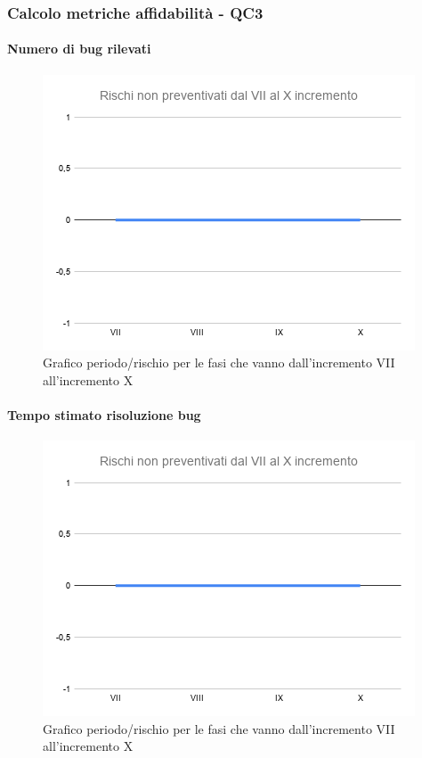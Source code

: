 \subsubsection{Calcolo metriche affidabilità - QC3}
\paragraph{Numero di bug rilevati}
\begin{figure}[H]
			\centering%
			\includegraphics[width=0.8\linewidth]{./res/images/RischiNonPreven_4.png}
			\caption{Grafico periodo/rischio per le fasi che vanno dall'incremento VII all'incremento X}
			\label{fig:Grafico periodo/rischio per le fasi che vanno dall'incremento VII all'incremento X}
	\end{figure}
\paragraph{Tempo stimato risoluzione bug}
\begin{figure}[H]
			\centering%
			\includegraphics[width=0.8\linewidth]{./res/images/RischiNonPreven_4.png}
			\caption{Grafico periodo/rischio per le fasi che vanno dall'incremento VII all'incremento X}
			\label{fig:Grafico periodo/rischio per le fasi che vanno dall'incremento VII all'incremento X}
	\end{figure}


